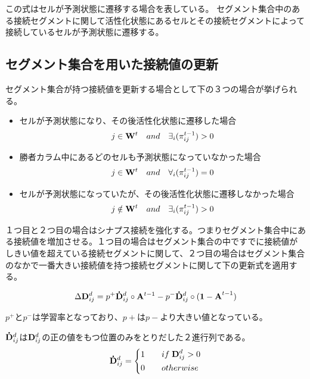 この式はセルが予測状態に遷移する場合を表している。
セグメント集合中のある接続セグメントに関して活性化状態にあるセルとその接続セグメントによって接続しているセルが予測状態に遷移する。
\subsection{セグメント集合を用いた接続値の更新}
セグメント集合が持つ接続値を更新する場合として下の３つの場合が挙げられる。
\begin{itemize}
  \item セルが予測状態になり、その後活性化状態に遷移した場合
  \begin{equation}
    j \in {\bf W}^ t \quad and \quad \exists_{i}(\pi^{t-1}_{ij}) > 0
  \end{equation}

  \item 勝者カラム中にあるどのセルも予測状態になっていなかった場合
  \begin{equation}
    j \in {\bf W}^t \quad and \quad \forall_{i}(\pi^{t-1}_{ij}) = 0
  \end{equation}

  \item セルが予測状態になっていたが、その後活性化状態に遷移しなかった場合
  \begin{equation}
    j \notin {\bf W}^ t \quad and \quad \exists_{i}(\pi^{t-1}_{ij}) > 0
  \end{equation}

\end{itemize}

１つ目と２つ目の場合はシナプス接続を強化する。つまりセグメント集合中にある接続値を増加させる。１つ目の場合はセグメント集合の中ですでに接続値がしきい値を超えている接続セグメントに関して、２つ目の場合はセグメント集合のなかで一番大きい接続値を持つ接続セグメントに関して下の更新式を適用する。

\begin{equation}
  \Delta {\bf D}^d_{ij} = p^+{\bf \dot{D}}^d_{ij} \circ {\bf A}^{t-1} - p^-{\bf \dot{D}}^d_{ij} \circ {\bf (1 - A}^{t-1})
\end{equation}

$p^+$と$p^-$は学習率となっており、$p+$は$p-$より大きい値となっている。

${\bf \dot{D}}^d_{ij}$は${\bf D}^d_{ij}$の正の値をもつ位置のみをとりだした２進行列である。
\begin{equation}
  {\bf \dot{D}}^d_{ij} =
  \left\{
  \begin{alignedat}{2}
    1 \qquad &if \; {\bf D}^d_{ij} > 0\\
    0 \qquad &otherwise
  \end{alignedat}
  \right.
\end{equation}

